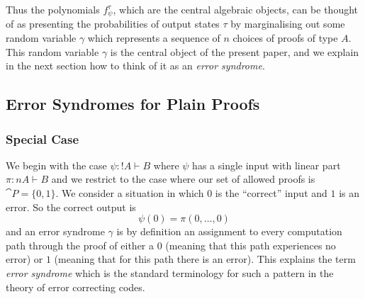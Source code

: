\documentclass[english,letter paper,12pt,reqno]{article}
\theoremstyle{definition}
\begin{document}
Thus the polynomials $f^\tau_\psi$, which are the central algebraic objects, can be thought of as presenting the probabilities of output states $\tau$ by marginalising out some random variable $\gamma$ which represents a sequence of $n$ choices of proofs of type $A$. This random variable $\gamma$ is the central object of the present paper, and we explain in the next section how to think of it as an \emph{error syndrome}.

\subsection{Error Syndromes for Plain Proofs}\label{section:error_syndromes}

\subsubsection{Special Case}

We begin with the case $\psi: {!} A \vdash B$ where $\psi$ has a single input with linear part $\pi: n A \vdash B$ and we restrict to the case where our set of allowed proofs is $\cat{P} = \{ 0, 1 \}$. We consider a situation in which $0$ is the ``correct'' input and $1$ is an error. So the correct output is
\[
\psi(0) = \pi(0, \ldots, 0)
\]
and an error syndrome $\gamma$ is by definition an assignment to every computation path through the proof of either a $0$ (meaning that this path experiences no error) or $1$ (meaning that for this path there is an error). This explains the term \emph{error syndrome} which is the standard terminology for such a pattern in the theory of error correcting codes.
\end{document}

